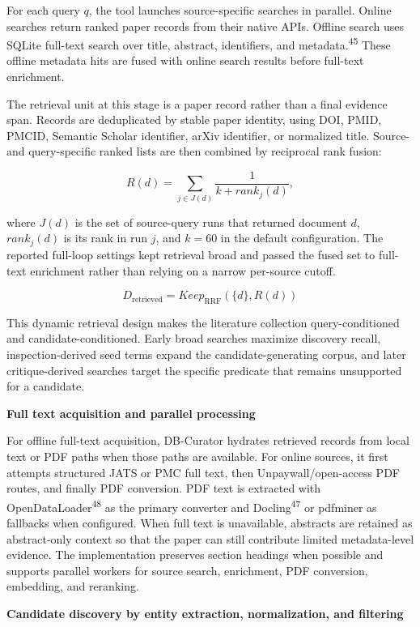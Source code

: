 \documentclass[
]{article}
\begin{document}
For each query \(q\), the tool launches source-specific searches in
parallel. Online searches return ranked paper records from their native
APIs. Offline search uses SQLite full-text search over title, abstract,
identifiers, and metadata.\textsuperscript{45} These offline metadata
hits are fused with online search results before full-text enrichment.

The retrieval unit at this stage is a paper record rather than a final
evidence span. Records are deduplicated by stable paper identity, using
DOI, PMID, PMCID, Semantic Scholar identifier, arXiv identifier, or
normalized title. Source- and query-specific ranked lists are then
combined by reciprocal rank fusion:

\[R(d) = \sum_{j \in J(d)} \frac{1}{k + rank_j(d)},\]

where \(J(d)\) is the set of source-query runs that returned document
\(d\), \(rank_j(d)\) is its rank in run \(j\), and \(k=60\) in the
default configuration. The reported full-loop settings kept retrieval broad and passed the
fused set to full-text enrichment rather than relying on a narrow
per-source cutoff.

\[D_{\text{retrieved}} = Keep_{\text{RRF}}\left(\{d\}, R(d)\right)\]

This dynamic retrieval design makes the literature collection
query-conditioned and candidate-conditioned. Early broad searches
maximize discovery recall, inspection-derived seed terms expand the
candidate-generating corpus, and later critique-derived searches target
the specific predicate that remains unsupported for a candidate.

\textbf{Full text acquisition and parallel processing}

For offline full-text acquisition, DB-Curator hydrates retrieved records
from local text or PDF paths when those paths are available. For online
sources, it first attempts structured JATS or PMC full text, then
Unpaywall/open-access PDF routes, and finally PDF conversion. PDF text
is extracted with OpenDataLoader\textsuperscript{48} as the primary
converter and Docling\textsuperscript{47} or pdfminer as fallbacks when
configured.
When full text is unavailable, abstracts are retained as abstract-only
context so that the paper can still contribute limited metadata-level
evidence. The implementation preserves section headings when possible
and supports parallel workers for source search, enrichment, PDF
conversion, embedding, and reranking.

\textbf{Candidate discovery by entity extraction, normalization, and filtering}
\end{document}
